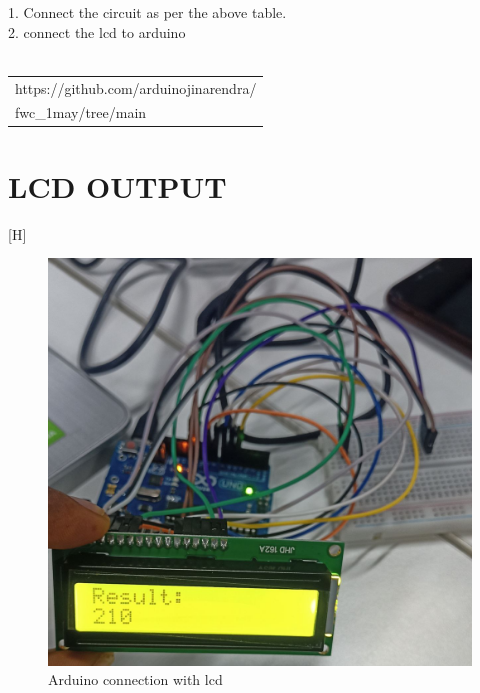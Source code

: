 \documentclass[journal,12pt,twocolumn]{IEEEtran}
\begin{document}
    1. Connect the circuit as per the above table.\\
    2. connect the lcd to arduino\\
\\ \begin{tabularx}{0.45\textwidth} { 
  | >{\centering\arraybackslash}X |}
  \hline
  https://github.com/arduinojinarendra/\\fwc\_1may/tree/main\\
  \hline
\end{tabularx}
    \section{LCD OUTPUT}[H]

 \begin{figure}
\centering
\includegraphics[width=\columnwidth]{lcd.png}
\caption{Arduino connection with lcd}
\label{fig:lcd}
\end{figure}

 
\end{document}
